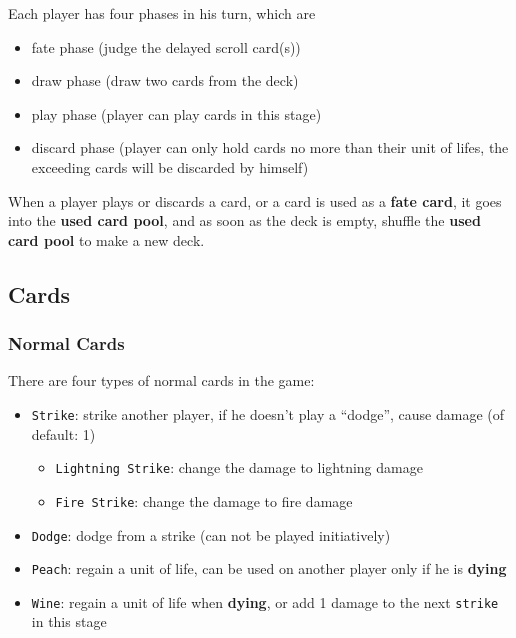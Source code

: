 \documentclass[11pt,a4paper]{article}
\begin{document}
Each player has four phases in his turn, which are
\begin{itemize}
\item fate phase (judge the delayed scroll card(s))
\item draw phase (draw two cards from the deck)
\item play phase (player can play cards in this stage)
\item discard phase (player can only hold cards no more than their unit of lifes, the exceeding cards will be discarded by himself)
\end{itemize}

When a player plays or discards a card, or a card is used as a \textbf{fate card}, it goes into the \textbf{used card pool}, and as soon as the deck is empty, shuffle the \textbf{used card pool} to make a new deck. \bigskip

\subsection{Cards}

\subsubsection{Normal Cards}

There are four types of normal cards in the game:
\begin{itemize}
\item \texttt{Strike}: strike another player, if he doesn't play a ``dodge'', cause damage (of default: 1)
\begin{itemize}
\item \texttt{Lightning Strike}: change the damage to lightning damage
\item \texttt{Fire Strike}: change the damage to fire damage
\end{itemize}
\item \texttt{Dodge}: dodge from a strike (can not be played initiatively)
\item \texttt{Peach}: regain a unit of life, can be used on another player only if he is \textbf{dying}
\item \texttt{Wine}: regain a unit of life when \textbf{dying}, or add 1 damage to the next \texttt{strike} in this stage
\end{itemize}
\end{document}
